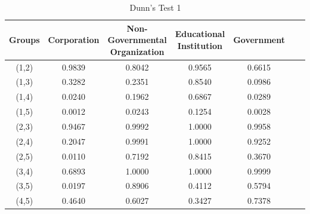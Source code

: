\begin{table}[h!]
  \centering
  \caption{Dunn's Test 1}
  \label{tab:dunn_stak}
  \begin{tabular}{ccccccc}
    \toprule
     Groups & Corporation & Non-Governmental Organization & Educational Institution & Government \\
    \midrule
    (1,2) & 0.9839 & 0.8042 & 0.9565 & 0.6615 \\
    (1,3) & 0.3282 & 0.2351 & 0.8540 & 0.0986 \\
    (1,4) & 0.0240 & 0.1962 & 0.6867 & 0.0289 \\
    (1,5) & 0.0012 & 0.0243 & 0.1254 & 0.0028 \\
    (2,3) & 0.9467 & 0.9992 & 1.0000 & 0.9958 \\
    (2,4) & 0.2047 & 0.9991 & 1.0000 & 0.9252  \\
    (2,5) & 0.0110 & 0.7192 & 0.8415 & 0.3670  \\
    (3,4) & 0.6893 & 1.0000 & 1.0000 & 0.9999 \\
    (3,5) & 0.0197 & 0.8906 & 0.4112 & 0.5794  \\
    (4,5) & 0.4640 & 0.6027 & 0.3427 & 0.7378 \\
    \bottomrule
  \end{tabular}
\end{table}  

